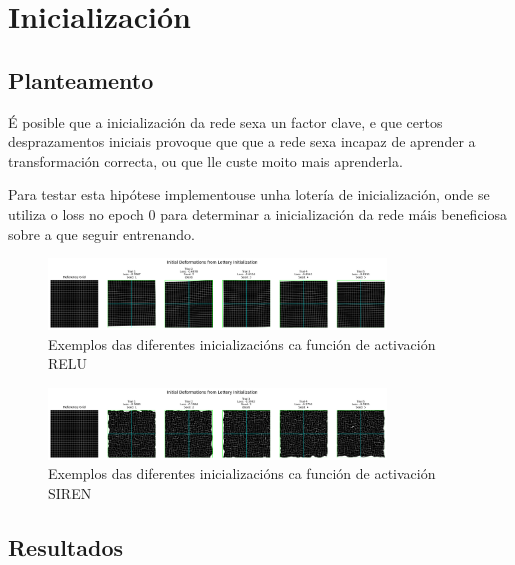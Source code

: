 \section{Inicialización}
\label{sec:Inicialización}

\subsection{Planteamento}
\label{subsec:Planteamento-initialization}

É posible que a inicialización da rede sexa un factor clave, e que certos desprazamentos iniciais provoque que que a rede sexa incapaz de aprender a transformación correcta, ou que lle custe moito mais aprenderla.

Para testar esta hipótese implementouse unha lotería de inicialización, onde se utiliza o loss no epoch 0 para determinar a inicialización da rede máis beneficiosa sobre a que seguir entrenando.


\begin{figure}[tbp]
    \centering
    \includegraphics[width=0.8\textwidth]{imaxes/lottery/initial_deformations_combinedMLP.png}
    \caption{Exemplos das diferentes inicializacións ca función de activación RELU}
    \label{fig:lottery_initial_deformations_combinedMLP}
\end{figure}

\begin{figure}[tbp]
    \centering
    \includegraphics[width=0.8\textwidth]{imaxes/lottery/initial_deformations_combinedSIREN.png}
    \caption{Exemplos das diferentes inicializacións ca función de activación SIREN}
    \label{fig:lottery_initial_deformations_combinedSIREN}
\end{figure}


\subsection{Resultados}
\label{subsec:Resultados-initialization}


